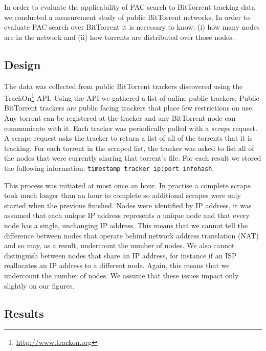In order to evaluate the applicability of PAC search to BitTorrent tracking data we conducted a measurement study of public BitTorrent networks. In order to evaluate PAC search over BitTorrent it is necessary to know: (i) how many nodes are in the network and (ii) how torrents are distributed over those nodes.

\subsection{Design}

    The data was collected from public BitTorrent trackers discovered using the TrackOn\footnote{\url{http://www.trackon.org}} API. Using the API we gathered a list of online public trackers. Public BitTorrent trackers are public facing trackers that place few restrictions on use. Any torrent can be registered at the tracker and any BitTorrent node can communicate with it. Each tracker was periodically polled with a \emph{scrape} request. A scrape request asks the tracker to return a list of all of the torrents that it is tracking. For each torrent in the scraped list, the tracker was asked to list all of the nodes that were currently sharing that torrent's file. For each result we stored the following information: \verb|timestamp tracker ip:port infohash|.

    This process was initiated at most once an hour. In practise a complete scrape took much longer than an hour to complete so additional scrapes were only started when the previous finished. Nodes were identified by IP address, it was assumed that each unique IP address represents a unique node and that every node has a single, unchanging IP address. This means that we cannot tell the difference between nodes that operate behind network address translation (NAT) and so may, as a result, undercount the number of nodes. We also cannot distinguish between nodes that share an IP address, for instance if an ISP reallocates an IP address to a different node. Again, this means that we undercount the number of nodes. We assume that these issues impact only slightly on our figures.

\subsection{Results}

